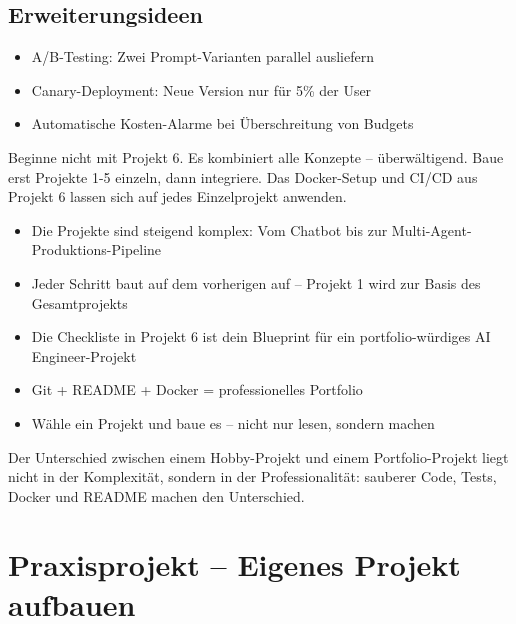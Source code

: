 \subsection*{Erweiterungsideen}
\begin{itemize}[leftmargin=*]
    \item A/B-Testing: Zwei Prompt-Varianten parallel ausliefern
    \item Canary-Deployment: Neue Version nur für 5\% der User
    \item Automatische Kosten-Alarme bei Überschreitung von Budgets
\end{itemize}

\begin{praxishinweis}
Beginne nicht mit Projekt 6. Es kombiniert alle Konzepte -- überwältigend. Baue erst Projekte 1-5 einzeln, dann integriere. Das Docker-Setup und CI/CD aus Projekt 6 lassen sich auf jedes Einzelprojekt anwenden.
\end{praxishinweis}

\begin{zusammenfassung}
\begin{itemize}[leftmargin=*]
    \item Die Projekte sind steigend komplex: Vom Chatbot bis zur Multi-Agent-Produktions-Pipeline
    \item Jeder Schritt baut auf dem vorherigen auf -- Projekt 1 wird zur Basis des Gesamtprojekts
    \item Die Checkliste in Projekt 6 ist dein Blueprint für ein portfolio-würdiges AI Engineer-Projekt
    \item Git + README + Docker = professionelles Portfolio
    \item Wähle ein Projekt und baue es -- nicht nur lesen, sondern machen
\end{itemize}
\end{zusammenfassung}

\begin{merke}
Der Unterschied zwischen einem Hobby-Projekt und einem Portfolio-Projekt liegt nicht in der Komplexität, sondern in der Professionalität: sauberer Code, Tests, Docker und README machen den Unterschied.
\end{merke}

\section{Praxisprojekt -- Eigenes Projekt aufbauen}


